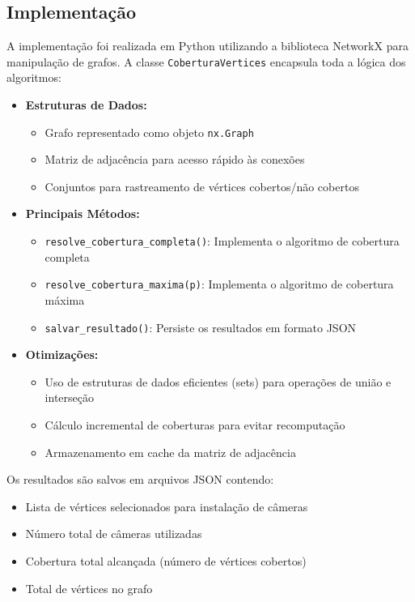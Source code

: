 \documentclass[12pt, a4paper]{report}
\begin{document}
\subsection{Implementação}
A implementação foi realizada em Python utilizando a biblioteca NetworkX para manipulação de grafos. A classe \texttt{CoberturaVertices} encapsula toda a lógica dos algoritmos:

\begin{itemize}
    \item \textbf{Estruturas de Dados:}
    \begin{itemize}
        \item Grafo representado como objeto \texttt{nx.Graph}
        \item Matriz de adjacência para acesso rápido às conexões
        \item Conjuntos para rastreamento de vértices cobertos/não cobertos
    \end{itemize}
    
    \item \textbf{Principais Métodos:}
    \begin{itemize}
        \item \texttt{resolve\_cobertura\_completa()}: Implementa o algoritmo de cobertura completa
        \item \texttt{resolve\_cobertura\_maxima(p)}: Implementa o algoritmo de cobertura máxima
        \item \texttt{salvar\_resultado()}: Persiste os resultados em formato JSON
    \end{itemize}
    
    \item \textbf{Otimizações:}
    \begin{itemize}
        \item Uso de estruturas de dados eficientes (sets) para operações de união e interseção
        \item Cálculo incremental de coberturas para evitar recomputação
        \item Armazenamento em cache da matriz de adjacência
    \end{itemize}
\end{itemize}

Os resultados são salvos em arquivos JSON contendo:
\begin{itemize}
    \item Lista de vértices selecionados para instalação de câmeras
    \item Número total de câmeras utilizadas
    \item Cobertura total alcançada (número de vértices cobertos)
    \item Total de vértices no grafo
\end{itemize}
\end{document}
